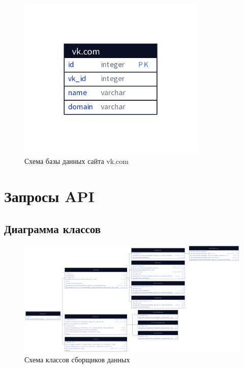 \documentclass[PI, VKR]{HSEUniversity}
\begin{document}
\begin{figure}[h!]
\centering
\includegraphics[width=0.8\textwidth]{img/d2/vk_com.png}
\caption{\label{fig:database_vk_com}Схема базы данных сайта vk.com}
\end{figure}

\chapter{Запросы API}
\label{sec:orgbe8919a}


\begin{landscape}
\chapter{Диаграмма классов}
\label{sec:org9eb5d3d}
\thispagestyle{empty}
\begin{figure}[h!]
\centering
\includegraphics[width=.9\linewidth]{img/d2/parser_class.png}
\caption{\label{fig:parser_class_diagram}Схема классов сборщиков данных}
\end{figure}
\end{landscape}
\end{document}
